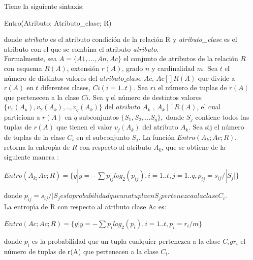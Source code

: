 Tiene la siguiente sintaxis:\\

\begin{center}
 Entro(Atributo; Atributo\_clase; R)\\
\end{center}

donde \textit{atributo} es el atributo condici\'on de la relaci\'on R y \textit{atributo\_clase} es el atributo
con el que se combina el atributo \textit{atributo}.\\

Formalmente, sea $A=\{A1, ..., An,Ac\}$ el conjunto de atributos de la relaci\'on $R$ con esquema $R(A)$,
extensi\'on $r(A)$, grado $n$ y cardinalidad $m$. Sea $t$ el n\'umero de distintos valores del $atributo\_clase$
$Ac$, $Ac [] R(A)$ que divide a $r(A)$ en $t$ diferentes clases, $Ci (i=1..t).$ Sea $ri$ el n\'umero de tuplas de
$r(A)$ que pertenecen a la clase $Ci$. Sea $q$ el n\'umero de destintos valores
$\{v_{1}(A_{k}),v_{2}(A_{k}),..,v_{q}(A_{k})\}$ del $atributo$ $A_{k}$ , $A_{k}[] R(A)$, el cual particiona a
$r(A)$ en $q$ subconjuntos $\{S_{1},S_{2},...S_{q}\},$ donde $S_{j}$ contiene todos las tuplas de $r(A)$ que
tienen el valor $v_{j}(A_{k})$ del atributo $A_{k}$. Sea sij el n\'umero de tuplas de la clase $C_{i}$ en el
subconjunto $S_{j}$. La funci\'on $Entro(A_{k}; Ac; R)$, retorna la entrop\'\i{}a de $R$ con respecto al atributo
$A_{k}$, que se obtiene de la siguiente manera :\\

\begin{center}
$Entro(A_{k;}Ac;R) = \{ y | y = - \sum p_{ij} log_{2}(p_{ij}), i=1..t, j=1 ..q, p_{ij} = s_{ij}/|S_{j}| \} $ \\
\end{center}

donde $ p_{ij}= s_{ij} / | S_{j} es la probabilidad que una tupla en S_{j} pertenezca a la clase C_{i}.$ \\

La entrop\'\i{}a de R con respecto al atributo clase Ac es:\\

\begin{center}
$ Entro(Ac;Ac; R)=\{ y | y = - \sum p_{i} log_{2}(p_{i}), i =1 ..t, p_{i} = r_{i} / m\} $ \\ 
\end{center}

donde $p_{i}$ es la probabilidad que un tupla cualquier pertenezca a la clase $C_{i} y r_{i} $ el n\'umero de
tuplas de r(A) que pertenecen a la clase $C_{i}.$

